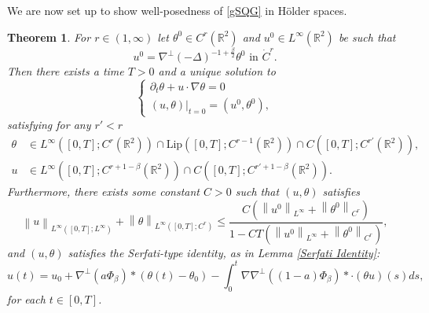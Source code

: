 \documentclass[12pt,xcolor=svgnames]{amsart}
\newtheorem{theorem}{Theorem}[section]
\newcommand{\R}{\mathbb{R}}
\newcommand{\norm}[2]{\left\lVert#1\right\rVert_{#2}}
\begin{document}
We are now set up to show well-posedness of \eqref{gSQG} in Hölder spaces.
\begin{theorem}
\label{Holder Result}
For $r \in (1,\infty)$ let $\theta^0 \in C^r(\R^2)$ and $u^0 \in L^{\infty}(\R^2)$ be such that
$$
u^0 = \nabla^{\perp}(-\Delta)^{-1+\frac{\beta}{2}} \theta^0 \text{ in } \dot{C}^r.
$$
Then there exists a time $T>0$ and a unique solution to 
\begin{equation}
\label{Holder gSQG}
\begin{cases}
\partial_t \theta + u\cdot \nabla \theta=0\\
(u,\theta)\vert_{t=0}=(u^0,\theta^0),
\end{cases}
\end{equation}
satisfying for any $r'<r$
\begin{align*}
\theta &\in L^{\infty}([0,T]; C^r(\R^2)) \cap \text{Lip}([0,T]; C^{r-1}(\R^2)) \cap C([0,T]; C^{r'}(\R^2)),\\
u &\in L^{\infty}([0,T]; C^{r+1-\beta}(\R^2)) \cap C([0,T]; C^{r'+1-\beta}(\R^2)).
\end{align*}
Furthermore, there exists some constant $C>0$ such that $(u,\theta)$ satisfies
\begin{equation}
\label{bound on holder norms of solution}
\norm{u}{L^{\infty}([0,T];L^{\infty})}+\norm{\theta}{L^{\infty}([0,T];C^r)} \leq \frac{C(\norm{u^0}{L^{\infty}}+\norm{\theta^0}{C^r})}{1-CT(\norm{u^0}{L^{\infty}}+\norm{\theta^0}{C^r})},
\end{equation}
and $(u,\theta)$ satisfies the Serfati-type identity, as in Lemma \ref{Serfati Identity}:
$$
u(t)=u_0 + \nabla^{\perp}(a\Phi_{\beta})\ast (\theta(t)-\theta_0) - \int_0^t \nabla \nabla^{\perp}((1-a)\Phi_{\beta})\ast\cdot (\theta u)(s)ds,
$$
for each $t \in [0,T]$.
\end{theorem}
\end{document}
